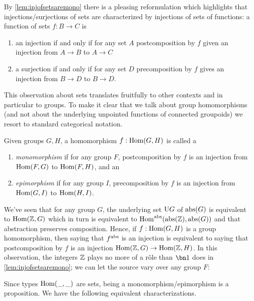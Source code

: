 

By \cref{lem:injofsetsaremono} there is a pleasing reformulation which highlights that injections/surjections of sets are characterized by injections of sets of functions: a function of sets $f:B\to C$ is
\begin{enumerate}
\item  an injection if and only if for any set $A$ postcomposition by $f$ given an injection from $A\to B$ to $A\to C$
\item a surjection if and only if for any set $D$ precomposition by $f$ gives an injection from $B\to D$ to $B\to D$.
\end{enumerate}

This observation about sets translates fruitfully to other contexts and in particular to groups.  To make it clear that we talk about group homomorphisms (and not about the underlying unpointed functions of connected groupoids) we resort to standard categorical notation.
\begin{definition}\label{def:monomorphism}
Given groups $G,H$, a homomorphism $f: \Hom(G,H)$ is called a\label{def:epimorphism}
\begin{enumerate}
\item \emph{monomorphism} if for any group $F$,
  postcomposition by $f$ is an injection from $\Hom(F,G)$ to $\Hom(F,H)$, and an
\item \emph{epimorphism} if for any group $I$,
  precomposition by $f$ is an injection from $\Hom(G,I)$ to $\Hom(H,I)$.
\end{enumerate}
\end{definition}

We've seen that for any group $G$, the underlying set $\mathrm{U} G$ of $\mathrm{abs}(G)$ is equivalent to $\Hom(\ZZ,G)$ which in turn is equivalent to $\Hom^{\abstr}(\abstr(\ZZ),\abstr(G))$ and that abstraction preserves composition.  Hence, if $f:\Hom(G,H)$ is a group homomorphism, then saying that
$f^{\mathrm{abs}}$ is an injection is equivalent to saying that postcomposition by $f$ is an injection $\Hom(\ZZ,G)\to\Hom(\ZZ,H)$.
In this observation, the integers $\mathbb{Z}$ plays no more of a r\^ole than $\bn 1$ does in \cref{lem:injofsetsaremono}; we can let the source vary over any group $F$: 
 
Since types $\Hom(\_,\_)$ are sets, being a monomorphism/epimorphism is a proposition.
We have the following equivalent characterizations.

